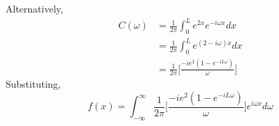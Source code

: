 \documentclass[12pt]{article}
\begin{document}
\noindent Alternatively,
\begin{align*}
  C(\omega) &= \frac{1}{2\pi} \int_{0}^{L}e^{2x}e^{-i\omega x} dx \\
  &= \frac{1}{2\pi} \int_{0}^{L}e^{(2-i\omega)x} dx \\
  &= \frac{1}{2\pi} \bigg[ \frac{-ie^2(1-e^{-iL\omega})}{\omega} \bigg]
\end{align*}
Substituting,
$$f(x) = \int_{-\infty}^{\infty} \frac{1}{2\pi} \bigg[ \frac{-ie^2(1-e^{-iL\omega})}{\omega} \bigg] e^{i\omega x} d\omega$$
\end{document}
